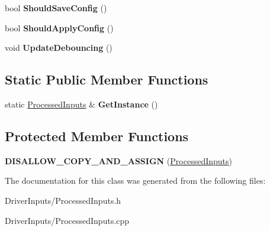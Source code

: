 \begin{DoxyCompactItemize}
\item 
\hypertarget{class_processed_inputs_ac8738507efed259815ba55871e543ef0}{
bool {\bfseries \-Should\-Save\-Config} ()}
\label{class_processed_inputs_ac8738507efed259815ba55871e543ef0}

\item 
\hypertarget{class_processed_inputs_a124403bfcf6d2a4c443bd8f8fb4d23d4}{
bool {\bfseries \-Should\-Apply\-Config} ()}
\label{class_processed_inputs_a124403bfcf6d2a4c443bd8f8fb4d23d4}

\item 
\hypertarget{class_processed_inputs_ae9c1b0c66a2590c1362b15f58e473a5c}{
void {\bfseries \-Update\-Debouncing} ()}
\label{class_processed_inputs_ae9c1b0c66a2590c1362b15f58e473a5c}

\end{DoxyCompactItemize}
\subsection*{\-Static \-Public \-Member \-Functions}
\begin{DoxyCompactItemize}
\item 
\hypertarget{class_processed_inputs_a0cc1683c0796dba59a271d03e852c014}{
static \hyperlink{class_processed_inputs}{\-Processed\-Inputs} \& {\bfseries \-Get\-Instance} ()}
\label{class_processed_inputs_a0cc1683c0796dba59a271d03e852c014}

\end{DoxyCompactItemize}
\subsection*{\-Protected \-Member \-Functions}
\begin{DoxyCompactItemize}
\item 
\hypertarget{class_processed_inputs_aa122ff93a0926ff2820c62f68e8ecd05}{
{\bfseries \-D\-I\-S\-A\-L\-L\-O\-W\-\_\-\-C\-O\-P\-Y\-\_\-\-A\-N\-D\-\_\-\-A\-S\-S\-I\-G\-N} (\hyperlink{class_processed_inputs}{\-Processed\-Inputs})}
\label{class_processed_inputs_aa122ff93a0926ff2820c62f68e8ecd05}

\end{DoxyCompactItemize}


\-The documentation for this class was generated from the following files\-:\begin{DoxyCompactItemize}
\item 
\-Driver\-Inputs/\-Processed\-Inputs.\-h\item 
\-Driver\-Inputs/\-Processed\-Inputs.\-cpp\end{DoxyCompactItemize}
